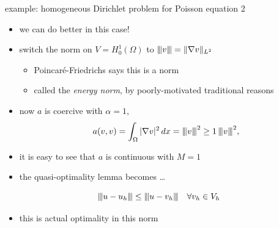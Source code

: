 \documentclass[10pt,
               svgnames,
               hyperref={colorlinks,
                         citecolor=DeepPink4,
                         linkcolor=FireBrick,
                         urlcolor=blue},
               usepdftitle=false]{beamer}
\newcommand{\grad}{\nabla}
\begin{document}
\newcommand{\vertiii}[1]{{\left\vert\kern-0.25ex\left\vert\kern-0.25ex\left\vert #1 
    \right\vert\kern-0.25ex\right\vert\kern-0.25ex\right\vert}}


\begin{frame}{example: homogeneous Dirichlet problem for Poisson equation 2}

\begin{itemize}
\item we can do better in this case!
\item switch the norm on $V=H_0^1(\Omega)$ to \quad \alert{$\vertiii{v}=\|\grad v\|_{L^2}$}
    \begin{itemize}
    \item[$\circ$] Poincar\'e-Friedrichs says this is a norm
    \item[$\circ$] called the \emph{energy norm}, by poorly-motivated traditional reasons
    \end{itemize}
\item now $a$ is coercive with $\alpha=1$,
    $$a(v,v) = \int_\Omega |\grad v|^2\,dx = \vertiii{v}^2 \ge 1\,\vertiii{v}^2,$$
\item it is easy to see that $a$ is continuous with $M=1$
\item the quasi-optimality lemma becomes \dots
\end{itemize}

\begin{corollary}
	$$\vertiii{u-u_h} \le \vertiii{u-v_h} \quad \forall v_h\in V_h$$
\end{corollary}

\begin{itemize}
\item this is \alert{actual optimality} in this norm
\end{itemize}
\end{frame}
\end{document}
